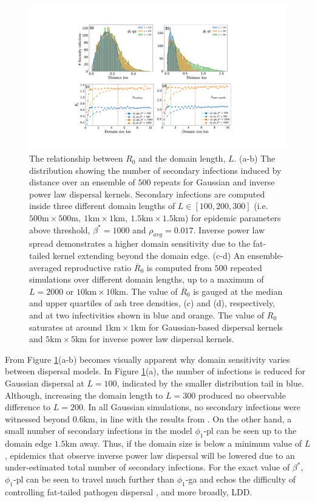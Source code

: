 \begin{figure}
    \centering
    \includegraphics[scale=0.42]{chapter6/figures/fig5-R0-domain-size.pdf}
    \caption{The relationship between $R_0$ and the domain length, $L$. (a-b) The 
    distribution showing the number of secondary infections induced by distance over an ensemble of $500$ repeats for Gaussian and inverse power law dispersal kernels.
    Secondary infections are computed inside three different domain lengths of $L \in [100, 200, 300]$ (i.e. $\mathrm{500m\times500m,\ 1km\times1km,\ 1.5km\times1.5km}$) for epidemic parameters above threshold, $\beta^*=1000$ and $\rho_{avg} = 0.017$. Inverse power law spread demonstrates a higher domain sensitivity due to the fat-tailed kernel extending beyond the domain edge. (c-d) An ensemble-averaged reproductive ratio $\overline{R}_0$ is computed from $500$ repeated simulations over different domain lengths, up to a maximum of $L=2000$ or $\mathrm{10km \times 10km}$. The value of $\overline{R}_0$ is gauged at the median and upper quartiles of ash tree densities, (c) and (d), respectively, and at two infectivities shown in blue and orange. The value of $R_0$ saturates at around $\mathrm{1km\times1km}$ for Gaussian-based dispersal kernels and $\mathrm{5km\times5 km}$ for inverse power law dispersal kernels.}
    
    \label{fig:r0-domain-size}
\end{figure}

From Figure \ref{fig:r0-domain-size}(a-b) becomes visually apparent why domain sensitivity varies between dispersal models.
In Figure \ref{fig:r0-domain-size}(a), the number of infections is reduced for Gaussian dispersal at $L=100$, indicated by the smaller distribution tail in blue.
Although, increasing the domain length to $L=300$ produced no observable difference to $L=200$.
In all Gaussian simulations, no secondary infections were witnessed beyond $0.6\mathrm{km}$, in line with the results from \cite{grosdidier2018tracking}. 
On the other hand, a small number of secondary infections in the model $\phi_1$-pl can be seen up to the domain edge $1.5\mathrm{km}$ away.
Thus, if the domain size is below a minimum value of $L$, epidemics that observe inverse power law dispersal will be lowered due to an under-estimated total number of secondary infections.
For the exact value of $\beta^*$, $\phi_1$-pl can be seen to travel much further than $\phi_1$-ga and echos the difficulty of controlling fat-tailed pathogen dispersal \cite{WEBIDEMICS}, and more broadly, LDD.

